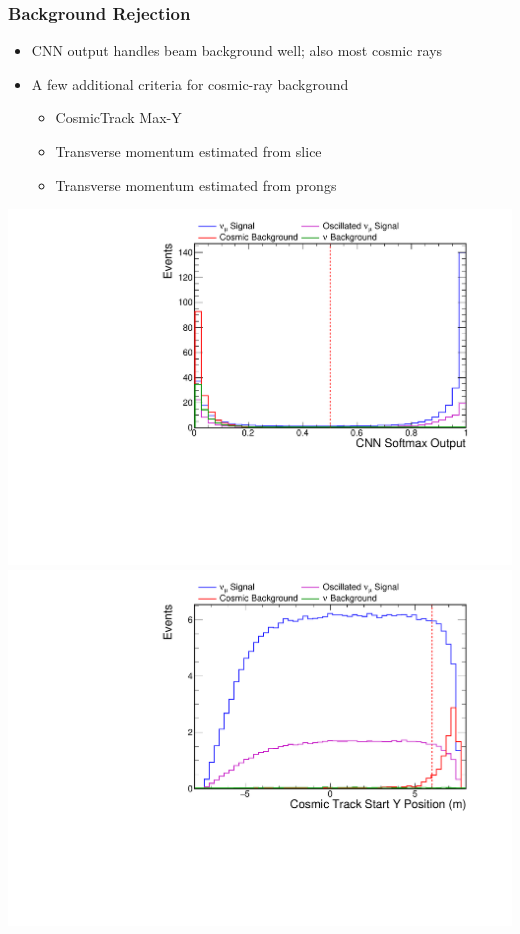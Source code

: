 \documentclass[10pt,professionalfonts,xcolor=table]{beamer}
\begin{document}
\begin{frame}
\frametitle{Background Rejection}

\begin{itemize}
\item CNN output handles beam background well; also most cosmic rays
\gap
\item A few additional criteria for cosmic-ray background
\begin{itemize}
\item CosmicTrack Max-Y
\item Transverse momentum estimated from slice
\item Transverse momentum estimated from prongs
\end{itemize}
\end{itemize}

\includegraphics[height=0.5\textwidth, angle=-90]{figures/selection/n1_cvnnumu.pdf}
\includegraphics[height=0.5\textwidth, angle=-90]{figures/selection/n1_cosStartY.pdf}

\end{frame}
\end{document}
